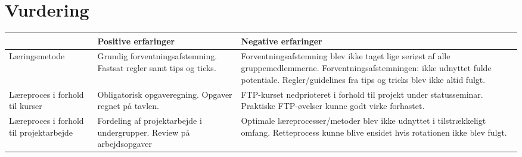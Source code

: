 \section{Vurdering}

\begin{table}[h]
	\begin{tabular}{|p{3cm}|p{5cm}|p{5cm}|}
		\hline
		&\textbf{Positive erfaringer}&\textbf{Negative erfaringer}\\ \hline
	Læringsmetode	& Grundig forventningsafstemning. \newline \newline Fastsat regler samt tips og ticks.& Forventningsafstemning blev ikke taget lige seriøst af alle gruppemedlemmerne. \newline \newline Forventningsafstemningen: ikke udnyttet fulde potentiale.\newline \newline
	 Regler/guidelines fra tips og tricks blev ikke altid fulgt. \\ \hline
	Læreproces i forhold til kurser & Obligatorisk opgaveregning. \newline \newline Opgaver regnet på tavlen. & FTP-kurset nedprioteret i forhold til projekt under statusseminar. \newline \newline Praktiske FTP-øvelser kunne godt virke forhastet. \\ \hline
	Læreproces i forhold til projektarbejde & Fordeling af projektarbejde i undergrupper. \newline \newline Review på arbejdsopgaver & Optimale læreprocesser/metoder blev ikke udnyttet i tilstrækkeligt omfang. \newline \newline Retteprocess kunne blive ensidet hvis rotationen ikke blev fulgt. \\ \hline
		
	\end{tabular}
\end{table}

